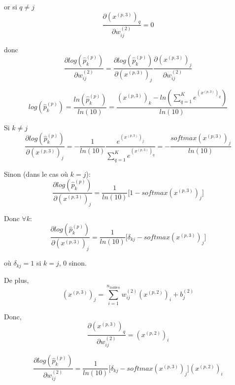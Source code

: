 \documentclass[a4paper,11pt,oneside,roman]{article}
\begin{document}
    or si $q \ne j$
    \begin{equation}
       \frac{\partial (x^{(p,3)})_{q}}{\partial w_{ij}^{(2)}} = 0
    \end{equation}
    
    donc
    \begin{equation}
        \frac{\partial log(\hat{p}_{k}^{(p)})}{\partial w_{ij}^{(2)}} = \frac{\partial log(\hat{p}_{k}^{(p)})}{\partial (x^{(p,3)})_{j}} \frac{\partial (x^{(p,3)})_{j}}{\partial w_{ij}^{(2)}}
    \end{equation}

    \begin{equation}
        log(\hat{p}_{k}^{(p)}) = \frac{ln(\hat{p}_{k}^{(p)})}{ln(10)} = \frac{(x^{(p,3)})_k - ln(\sum\limits_{q=1}^{K} e^{(x^{(p,3)})_q})} {ln(10)}
    \end{equation}

    Si $k \ne j$
    \begin{equation}
        \frac{\partial log(\hat{p}_{k}^{(p)})}{\partial (x^{(p,3)})_{j}} = -\frac{1}{ln(10)} \frac{e^{(x^{(p,3)})_j}}{\sum\limits_{q=1}^{K} e^{(x^{(p,3)})_q}} = -\frac{softmax(x^{(p,3)})_j}{ln(10)}
    \end{equation}

    Sinon (dans le cas où $k = j$):
    \begin{equation}
        \frac{\partial log(\hat{p}_{k}^{(p)})}{\partial (x^{(p,3)})_{j}} = \frac{1}{ln(10)} \bigg[ 1 - softmax(x^{(p,3)})_j \bigg]
    \end{equation}

    Donc $\forall k$:
    \begin{equation}
        \frac{\partial log(\hat{p}_{k}^{(p)})}{\partial (x^{(p,3)})_{j}} = \frac{1}{ln(10)} \bigg[ \delta_{kj} - softmax(x^{(p,3)})_j \bigg]
        \label{log_x3}
    \end{equation}
    
    où $ \delta_{kj} = 1$ si $k = j$, $0$ sinon.
    
    De plus,
    \begin{equation}
        (x^{(p,3)})_{j} = \sum\limits_{i=1}^{n_{hidden}} w_{ij}^{(2)}(x^{(p,2)})_i + b_j^{(2)}
    \end{equation}

    Donc,
    \begin{equation}
        \frac{\partial (x^{(p,3)})_{q}}{\partial w^{(2)}_{ij}} = (x^{(p,2)})_i
    \end{equation}

    \begin{equation}
        \frac{\partial log(\hat{p}_{k}^{(p)})}{\partial w^{(2)}_{ij}} = \frac{1}{ln(10)} \bigg[ \delta_{kj} - softmax(x^{(p,3)})_j \bigg] (x^{(p,2)})_{i}
    \end{equation}
\end{document}
